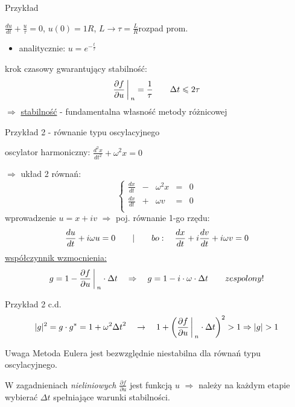 
\begin{frame}{Przykład}
	\begin{center}
	$\frac{du}{dt}+\frac{u}{\tau} = 0$, \quad $u(0) = 1$\newline $R$, $L\rightarrow \tau = \frac{L}{R}$\qquad rozpad prom.\par
      \begin{itemize}
    \item analitycznie: $u = e^{-\frac{t}{\tau}}$
    \end{itemize}
	\end{center}
  
  krok czasowy gwarantujący stabilność:
  $$\frac{\partial f}{\partial u}\bigg\arrowvert_n = \frac{1}{\tau}\qquad \Delta t \leqslant 2\tau$$
  $\Rightarrow$ \underline{stabilność} - fundamentalna własność metody różnicowej
\end{frame}

\begin{frame}{Przykład 2 - równanie typu oscylacyjnego}
	\begin{center}
		oscylator harmoniczny: \qquad $\frac{d^2x}{dt^2}+ \omega^2x=0$
	\end{center}
    $\Rightarrow$ układ 2 równań:
    $$\left\{\begin{array}{lccll}
	\frac{dx}{dt}&-&\omega^2x&=&0\\
	\frac{dx}{dt}&+&\omega v&=&0\\
	\end{array} \right.$$
    wprowadzenie \qquad \underline{$u = x+iv$} $\Rightarrow$ poj. równanie 1-go rzędu:
    $$ \frac{du}{dt} + i\omega u= 0 \qquad \arrowvert \qquad bo: \quad \frac{dx}{dt} + i\frac{dv}{dt}+i\omega v = 0$$
    \underline{współczynnik wzmocnienia:}
    $$g = 1-{\frac{\partial f}{\partial u}}\bigg\arrowvert _n \cdot \Delta t \quad \Rightarrow \quad g=1-i\cdot \omega \cdot \Delta t \qquad zespolony!$$
\end{frame}

\begin{frame}{Przykład 2 c.d.}
	$$|g|^2 = g \cdot g^* = 1+\omega^2 {\Delta t}^2 \quad \rightarrow \quad 1+\bigg(\frac{\partial f}{\partial u}\bigg{\arrowvert}_n \cdot \Delta t\bigg)^2 > 1 \Rightarrow |g| > 1 $$
    \begin{block}{Uwaga}
    	Metoda Eulera jest bezwzględnie niestabilna dla równań typu oscylacyjnego.
    \end{block}
    W zagadnieniach \textit{nieliniowych $\frac{\partial f}{\partial u}$} jest funkcją $u$ \quad $\Rightarrow$ \quad należy na każdym etapie wybierać $\Delta t$ spełniające warunki stabilności. 
\end{frame}
